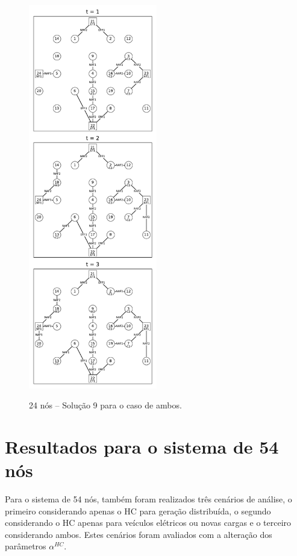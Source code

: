 \begin{figure}[H]
 	\centering
    \caption{24 nós -- Solução 9 para o caso de ambos.}
    \includegraphics[width=0.5\textwidth]{cap4/resultados/24_both9.pdf}\\
    \label{fig:24_both9}
\end{figure}

\section{Resultados para o sistema de 54 nós}

Para o sistema de 54 nós, também foram realizados três cenários de análise, o primeiro considerando apenas o \ac{HC} para geração distribuída, o segundo considerando o \ac{HC} apenas para veículos elétricos ou novas cargas e o terceiro considerando ambos. Estes cenários foram avaliados com a alteração dos parâmetros $\alpha^{HC}$.

